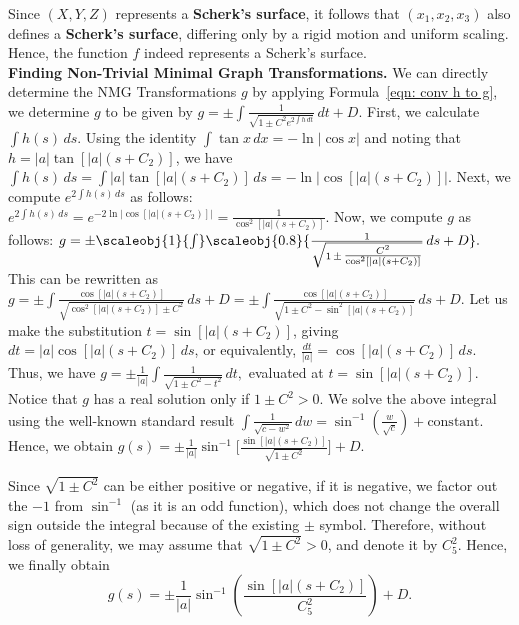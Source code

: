 \documentclass[12pt]{article}
\theoremstyle{plain}
\theoremstyle{definition}
\theoremstyle{remark}
\begin{document}
Since \((X, Y, Z)\) represents a \textbf{Scherk’s surface}, it follows that \((x_1, x_2, x_3)\) also defines a \textbf{Scherk’s surface}, differing only by a rigid motion and uniform scaling. Hence, the function \(f\) indeed represents a Scherk’s surface.\\


\textbf{Finding Non-Trivial Minimal Graph Transformations.}  
We can directly determine the NMG Transformations \(g\) by applying Formula~\ref{eqn: conv h to g}, we determine \(g\) to be given by  \(g = \pm \int \frac{1}{\sqrt{1 \pm C^2 e^{2\int h\, dt}}}\, dt + D\). First, we calculate \(\int h(s)\, ds\). Using the identity \(\int \tan x \, dx = -\ln|\cos x|\) and noting that \(h = |a|\tan[|a|(s + C_2)]\), we have \(\int h(s)\, ds = \int |a|\tan[|a|(s + C_2)]\, ds = -\ln\!\big|\cos[|a|(s + C_2)]\big|\). Next, we compute \(e^{2\int h(s)\, ds}\) as follows: \(e^{2\int h(s)\, ds} = e^{-2\ln\!\big|\cos[|a|(s + C_2)]\big|} = \frac{1}{\cos^2[|a|(s + C_2)]}\). Now, we compute \(g\) as follows:  
\(g = \pm \scaleobj{1}{\int} \scaleobj{0.8}{\frac{1}{\sqrt{1\, \pm\, \tfrac{C^2}{\cos^2[|a|(s + C_2)]}}}\, ds + D}.\)  This can be rewritten as  \(g = \pm \int \frac{\cos[|a|(s + C_2)]}{\sqrt{\cos^2[|a|(s + C_2)] \pm C^2}}\, ds + D = \pm \int \frac{\cos[|a|(s + C_2)]}{\sqrt{1 \pm C^2 - \sin^2[|a|(s + C_2)]}}\, ds + D.\) Let us make the substitution \(t = \sin[|a|(s + C_2)]\), giving \(dt = |a|\cos[|a|(s + C_2)]\, ds\), or equivalently, \(\frac{dt}{|a|} = \cos[|a|(s + C_2)]\, ds.\)  
Thus, we have  
\(g = \pm \frac{1}{|a|} \int \frac{1}{\sqrt{1 \pm C^2 - t^2}}\, dt,\)  
evaluated at \(t = \sin[|a|(s + C_2)].\) Notice that \(g\) has a real solution only if \(1 \pm C^2 > 0.\) We solve the above integral using the well-known standard result \(\int \frac{1}{\sqrt{c - w^2}}\, dw = \sin^{-1}\!\left(\frac{w}{\sqrt{c}}\right) + \text{constant}.\) Hence, we obtain  
\(g(s) = \pm \tfrac{1}{|a|}\sin^{-1}\big[\tfrac{\sin[|a|(s + C_2)]}{\sqrt{1 \pm C^2}}\big] + D.\)


Since \(\sqrt{1 \pm C^2}\) can be either positive or negative, if it is negative, we factor out the \(-1\) from \(\sin^{-1}\) (as it is an odd function), which does not change the overall sign outside the integral because of the existing \(\pm\) symbol. Therefore, without loss of generality, we may assume that \(\sqrt{1 \pm C^2} > 0\), and denote it by \(C_5^2.\) Hence, we finally obtain  
\[
\boxed{g(s) = \pm \frac{1}{|a|}\sin^{-1}\!\left(\frac{\sin[|a|(s + C_2)]}{C_5^2}\right) + D.}
\]\\
\end{document}
